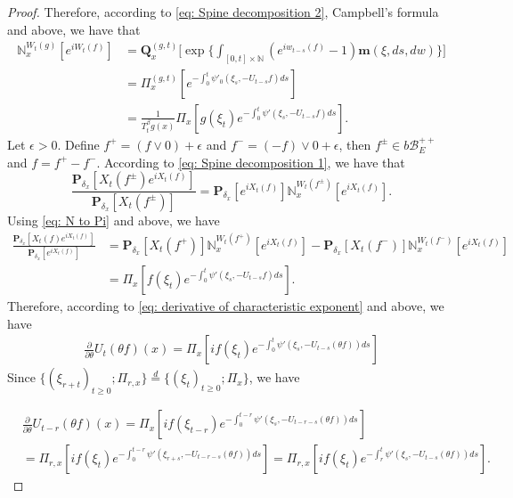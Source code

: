\documentclass[12pt,oneside,english]{amsart}
\theoremstyle{plain}
\theoremstyle{definition}
\numberwithin{equation}{section}
\begin{document}
\begin{proof}
    Therefore, according to \eqref{eq: Spine decomposition 2}, Campbell's formula and above, we have that
\begin{align}
\label{eq: N to Pi}
    \mathbb N_x^{W_t(g)}[e^{i W_t(f)}]
    &=\mathbf Q_x^{(g,t)} \Big[\exp\Big\{\int_{[0,t]\times \mathbb N}(e^{i w_{t-s}(f)} - 1) \mathbf m(\xi, ds,dw)\Big\}\Big]
    \\&= \Pi_x^{(g,t)} [e^{-\int_0^t \psi'_0(\xi_s, -U_{t-s}f)ds}]
    \\&= \frac{1}{T_t^\beta g (x)} \Pi_x[ g(\xi_t) e^{-\int_0^t \psi'(\xi_s, -U_{t-s}f)ds} ].
\end{align}
    Let $\epsilon >0$.
    Define $f^+ = (f \vee 0) + \epsilon$ and $f^- = (-f) \vee 0 + \epsilon$, then $f^\pm \in b\mathscr B^{++}_E$ and $f = f^+ - f^-$.
    According to \eqref{eq: Spine decomposition 1}, we have that
\begin{equation}
    \frac{\mathbf P_{\delta_x}[X_t(f^{\pm})e^{i X_t(f)}]}{\mathbf P_{\delta_x}[X_t(f^{\pm})]}
    = \mathbf P_{\delta_x}[e^{i X_t(f)}] \mathbb N_x^{W_t(f^{\pm})}[e^{i X_t(f)}].
\end{equation}
    Using \eqref{eq: N to Pi} and above, we have
\begin{align}
    \frac{\mathbf P_{\delta_x}[X_t(f)e^{i X_t(f)}] }{\mathbf P_{\delta_x}[e^{i X_t(f)}]}
    &= \mathbf P_{\delta_x}[X_t(f^+)] \mathbb N_x^{W_t(f^+)} [e^{i X_t(f)}] - \mathbf P_{\delta_x}[X_t(f^-)]\mathbb N_x^{W_t(f^-)}[e^{i X_t(f)}]
    \\& = \Pi_x[ f(\xi_t) e^{- \int_0^t \psi'(\xi_s, -U_{t-s}f) ds}  ].
\end{align}
    Therefore, according to \eqref{eq: derivative of characteristic exponent} and above, we have
\begin{align}
    \frac{\partial}{\partial \theta} {U_t(\theta f)(x)} 
    =  \Pi_x[ if(\xi_t) e^{ - \int_0^t \psi'(\xi_s, -U_{t-s}(\theta f)) ds} ]
\end{align}
    Since $\{(\xi_{r+t})_{t \geq 0}; \Pi_{r,x}\} \overset{d}{=} \{(\xi_{t})_{t\geq 0}; \Pi_{x}\} $, we have

\begin{align}
    &\frac{\partial}{\partial \theta} U_{t-r}(\theta f)( x)
    = \Pi_x[ i f(\xi_{t-r}) e^{-\int_0^{t-r} \psi'(\xi_s, -U_{t-r-s}(\theta f)) ds} ]
    \\&= \Pi_{r,x}[i f(\xi_t)e^{-\int_0^{t-r} \psi'(\xi_{r+s}, -U_{t-r-s}(\theta f)) ds} ]
    = \Pi_{r,x}[if(\xi_t)e^{-\int_r^t \psi'(\xi_{s}, -U_{t-s}(\theta f)) ds} ].
\end{align}


\end{proof}
\end{document}
